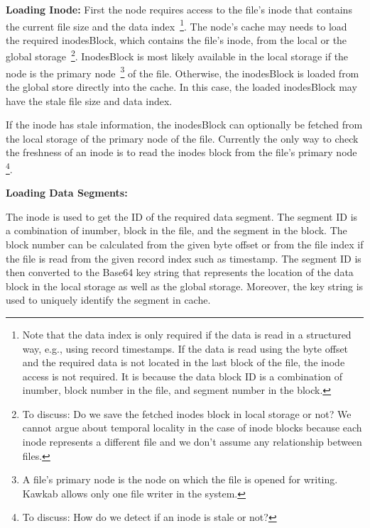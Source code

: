 \documentclass[]{article}
\newcommand{\subtopic}[1]{\vspace{1.5pt} \noindent \textbf{#1}}
\newcommand{\hl}[1]{\textcolor{hlcolor}{#1}}
\begin{document}
\subtopic{Loading Inode:} First the node requires access to the file's inode
that contains the current file size and the data index~\footnote{Note that the
data index is only required if the data is read in a structured way, e.g.,
using record timestamps. If the data is read using the byte offset and the
required data is not located in the last block of the file, the inode access is
not required. It is because the data block ID is a combination of inumber,
block number in the file, and segment number in the block.}.  The node's cache
may needs to load the required inodesBlock, which contains the file's inode,
from the local or the global storage~\footnote{\hl{To discuss: Do we save the
fetched inodes block in local storage or not? We cannot argue about temporal
locality in the case of inode blocks because each inode represents a different
file and we don't assume any relationship between files.}}.  InodesBlock is
most likely available in the local storage if the node is the primary
node~\footnote{A file's primary node is the node on which the file is opened
for writing. Kawkab allows only one file writer in the system.} of the file.
Otherwise, the inodesBlock is loaded from the global store directly into the
cache. In this case, the loaded inodesBlock may have the stale file size and
data index. 

If the inode has stale information, the inodesBlock can optionally
be fetched from the local storage of the primary node of the file. Currently
the only way to check the freshness of an inode is to read the inodes block
from the file's primary node
\footnote{\hl{To discuss: How do we detect if an inode is stale or not?}}.






\subtopic{Loading Data Segments:}

The inode is used to get the ID of the required data segment. The segment ID is
a combination of inumber, block in the file, and the segment in the block. The
block number can be calculated from the given byte offset or from the file
index if the file is read from the given record index such as timestamp. The
segment ID is then converted to the Base64 key string that represents the
location of the data block in the local storage as well as the global storage.
Moreover, the key string is used to uniquely identify the segment in cache.
\end{document}
